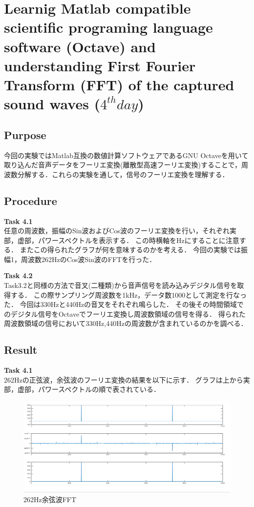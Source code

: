 \documentclass[11pt, a4paper,twocolumn]{jarticle}
\begin{document}
\section{Learnig Matlab compatible scientific programing language software (Octave) and understanding First Fourier Transform (FFT) of the captured sound waves ($4^{th} day$)}
\subsection{Purpose}
今回の実験ではMatlab互換の数値計算ソフトウェアであるGNU Octaveを用いて取り込んだ音声データをフーリエ変換(離散型高速フーリエ変換)することで，周波数分解する．これらの実験を通して，信号のフーリエ変換を理解する．
\subsection{Procedure}
\noindent
\textbf{Task 4.1} \\
任意の周波数，振幅のSin波およびCos波のフーリエ変換を行い，それぞれ実部，虚部，パワースペクトルを表示する．
この時横軸をHzにすることに注意する．
またこの得られたグラフが何を意味するのかを考える．
今回の実験では振幅1，周波数262HzのCos波Sin波のFFTを行った．

\noindent
\textbf{Task 4.2} \\
Task3.2と同様の方法で音叉(二種類)から音声信号を読み込みデジタル信号を取得する．
この際サンプリング周波数を1kHz，データ数1000として測定を行なった．
今回は330Hzと440Hzの音叉をそれぞれ鳴らした．
その後その時間領域でのデジタル信号をOctaveでフーリエ変換し周波数領域の信号を得る．
得られた周波数領域の信号において330Hz,440Hzの周波数が含まれているのかを調べる．

\subsection{Result}
\noindent
\textbf{Task 4.1} \\
262Hzの正弦波，余弦波のフーリエ変換の結果を以下に示す．
グラフは上から実部，虚部，パワースペクトルの順で表されている．

\begin{figure}[htbp]
 \begin{center}
  \includegraphics[width=0.8\linewidth]{fig22.png}
 \end{center}
 \caption{262Hz余弦波FFT}
 \label{fig:22}
\end{figure}
\end{document}
